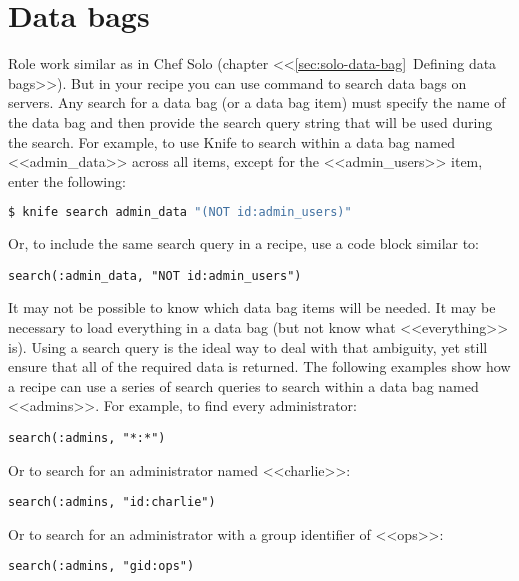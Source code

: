 \section{Data bags}

Role work similar as in Chef Solo (chapter <<\ref{sec:solo-data-bag}~Defining data bags>>). But in your recipe you can use  command to search data bags on servers. Any search for a data bag (or a data bag item) must specify the name of the data bag and then provide the search query string that will be used during the search. For example, to use Knife to search within a data bag named <<admin\_data>> across all items, except for the <<admin\_users>> item, enter the following:

\begin{lstlisting}[language=Bash,label=lst:my-server-cloud-databag1]
$ knife search admin_data "(NOT id:admin_users)"
\end{lstlisting}

Or, to include the same search query in a recipe, use a code block similar to:

\begin{lstlisting}[label=lst:my-server-cloud-databag2]
search(:admin_data, "NOT id:admin_users")
\end{lstlisting}

It may not be possible to know which data bag items will be needed. It may be necessary to load everything in a data bag (but not know what <<everything>> is). Using a search query is the ideal way to deal with that ambiguity, yet still ensure that all of the required data is returned. The following examples show how a recipe can use a series of search queries to search within a data bag named <<admins>>. For example, to find every administrator:

\begin{lstlisting}[label=lst:my-server-cloud-databag3]
search(:admins, "*:*")
\end{lstlisting}

Or to search for an administrator named <<charlie>>:

\begin{lstlisting}[label=lst:my-server-cloud-databag4]
search(:admins, "id:charlie")
\end{lstlisting}

Or to search for an administrator with a group identifier of <<ops>>:

\begin{lstlisting}[label=lst:my-server-cloud-databag5]
search(:admins, "gid:ops")
\end{lstlisting}

